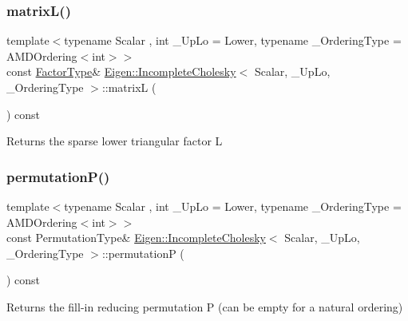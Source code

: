 \subsubsection{\texorpdfstring{matrixL()}{matrixL()}}
{\footnotesize\ttfamily template$<$typename Scalar , int \+\_\+\+Up\+Lo = Lower, typename \+\_\+\+Ordering\+Type  = A\+M\+D\+Ordering$<$int$>$$>$ \\
const \mbox{\hyperlink{class_eigen_1_1_sparse_matrix}{Factor\+Type}}\& \mbox{\hyperlink{class_eigen_1_1_incomplete_cholesky}{Eigen\+::\+Incomplete\+Cholesky}}$<$ Scalar, \+\_\+\+Up\+Lo, \+\_\+\+Ordering\+Type $>$\+::matrixL (\begin{DoxyParamCaption}{ }\end{DoxyParamCaption}) const\hspace{0.3cm}{\ttfamily [inline]}}

\begin{DoxyReturn}{Returns}
the sparse lower triangular factor L 
\end{DoxyReturn}
\mbox{\label{class_eigen_1_1_incomplete_cholesky_a0d52cec5e17f485a362766363ba90b02}} 
\subsubsection{\texorpdfstring{permutationP()}{permutationP()}}
{\footnotesize\ttfamily template$<$typename Scalar , int \+\_\+\+Up\+Lo = Lower, typename \+\_\+\+Ordering\+Type  = A\+M\+D\+Ordering$<$int$>$$>$ \\
const Permutation\+Type\& \mbox{\hyperlink{class_eigen_1_1_incomplete_cholesky}{Eigen\+::\+Incomplete\+Cholesky}}$<$ Scalar, \+\_\+\+Up\+Lo, \+\_\+\+Ordering\+Type $>$\+::permutationP (\begin{DoxyParamCaption}{ }\end{DoxyParamCaption}) const\hspace{0.3cm}{\ttfamily [inline]}}

\begin{DoxyReturn}{Returns}
the fill-\/in reducing permutation P (can be empty for a natural ordering) 
\end{DoxyReturn}
\mbox{\label{class_eigen_1_1_incomplete_cholesky_a4780a83266c871782595081021268b5a}} 

